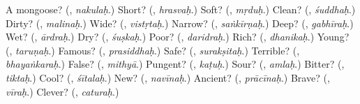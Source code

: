 \begin{tcolorbox}[breakable,colback=teal!4,colframe=teal!35!black,title={Before you move on}]
A mongoose? (\textbf{}, \emph{nakulaḥ}.) Short? (\textbf{}, \emph{hrasvaḥ}.) Soft? (\textbf{}, \emph{mṛduḥ}.) Clean? (\textbf{}, \emph{śuddhaḥ}.) Dirty? (\textbf{}, \emph{malinaḥ}.) Wide? (\textbf{}, \emph{vistṛtaḥ}.) Narrow? (\textbf{}, \emph{saṅkīrṇaḥ}.) Deep? (\textbf{}, \emph{gabhīraḥ}.) Wet? (\textbf{}, \emph{ārdraḥ}.) Dry? (\textbf{}, \emph{śuṣkaḥ}.) Poor? (\textbf{}, \emph{daridraḥ}.) Rich? (\textbf{}, \emph{dhanikaḥ}.) Young? (\textbf{}, \emph{taruṇaḥ}.) Famous? (\textbf{}, \emph{prasiddhaḥ}.) Safe? (\textbf{}, \emph{surakṣitaḥ}.) Terrible? (\textbf{}, \emph{bhayaṅkaraḥ}.) False? (\textbf{}, \emph{mithyā}.) Pungent? (\textbf{}, \emph{kaṭuḥ}.) Sour? (\textbf{}, \emph{amlaḥ}.) Bitter? (\textbf{}, \emph{tiktaḥ}.) Cool? (\textbf{}, \emph{śītalaḥ}.) New? (\textbf{}, \emph{navīnaḥ}.) Ancient? (\textbf{}, \emph{prācīnaḥ}.) Brave? (\textbf{}, \emph{vīraḥ}.) Clever? (\textbf{}, \emph{caturaḥ}.)
\end{tcolorbox}
